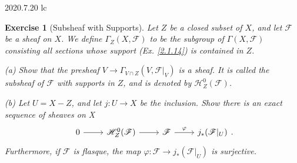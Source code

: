 \documentclass{amsart}
\newtheorem{exe}{Exercise}[subsection]
\begin{document}
2020.7.20 lc

\begin{exe}[Subsheaf with Supports]
	\label{2.1.20}
	Let $Z$ be a closed subset of $X$, and let $\mathscr{F}$ be a sheaf on $X$. We define $\Gamma_Z(X,\mathscr{F})$ to be the subgroup of $\Gamma(X,\mathscr{F})$ consisting all sections whose support \textup{(Ex. \ref{2.1.14})} is contained in $Z$.
	
	(a) Show that the presheaf $V\to\Gamma_{V\cap Z}(V,\mathscr{F}|_V)$ is a sheaf. It is called the subsheaf of $\mathscr{F}$ with supports in $Z$, and is denoted by $\mathscr{H}_Z^0(\mathscr{F})$.
	
	(b) Let $U=X-Z$, and let $j:U\to X$ be the inclusion. Show there is an exact sequence of sheaves on X
	\begin{equation*}
		\begin{tikzcd}
			0 \arrow[r] & \mathscr{H}_Z^0(\mathscr{F}) \arrow[r] & \mathscr{F} \arrow[r, "\varphi"] & j_*(\mathscr{F}|_U)
		\end{tikzcd}.
	\end{equation*}
	Furthermore, if $\mathscr{F}$ is flasque, the map $\varphi:\mathscr{F}\to j_*(\mathscr{F}|_U)$ is surjective.
\end{exe}
\end{document}
